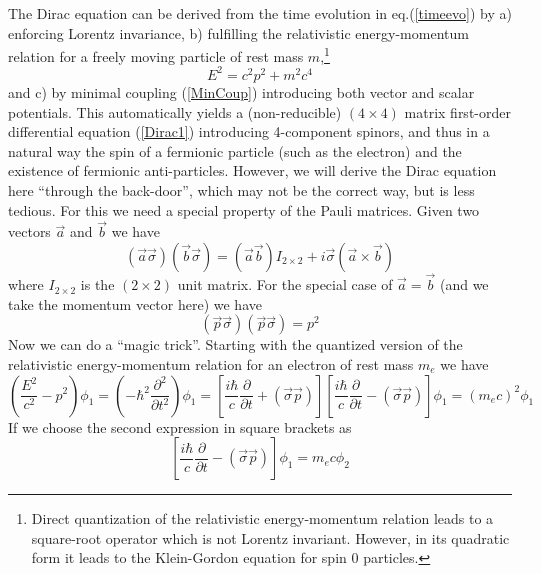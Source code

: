 \documentclass[12pt]{article}
\begin{document}
The Dirac equation can be derived from the time evolution in eq.(\ref{timeevo}) by a) enforcing Lorentz invariance, b) fulfilling the relativistic energy-momentum relation for a freely moving particle of rest mass $m$,\footnote{Direct quantization of the relativistic energy-momentum relation leads to a square-root operator which is not Lorentz invariant. However, in its quadratic form it leads to the Klein-Gordon equation for spin 0 particles.}
\begin{equation}
   E^2 = c^2p^2 + m^2c^4
   \label{RelEnergy}
\end{equation}
and c) by minimal coupling (\ref{MinCoup}) introducing both vector and scalar potentials. This automatically yields a (non-reducible) $(4\times 4)$ matrix first-order differential equation (\ref{Dirac1}) introducing 4-component spinors, and thus in a natural way the spin of a fermionic particle (such as the electron) and the existence of fermionic anti-particles. However, we will derive the Dirac equation here ``through the back-door'', which may not be the correct way, but is less tedious. For this we need a special property of the Pauli matrices. Given two vectors $\vec{a}$ and $\vec{b}$ we have
\begin{equation}
   \left(\vec{a}\vec{\sigma} \right) \left(\vec{b}\vec{\sigma} \right) = \left(\vec{a}\vec{b} \right) I_{2\times 2} + i\vec{\sigma} \left(\vec{a}\times \vec{b} \right)
   \label{PropPauli}
\end{equation}
where $I_{2\times 2}$ is the $(2\times 2)$ unit matrix. For the special case of $\vec{a}=\vec{b}$ (and we take the momentum vector here) we have
\begin{equation}
   \left(\vec{p}\vec{\sigma} \right) \left(\vec{p}\vec{\sigma} \right) = p^2
   \label{PropPauli1}
\end{equation}
Now we can do a ``magic trick''. Starting with the quantized version of the relativistic energy-momentum relation for an electron of rest mass $m_e$ we have
\begin{equation}
   \left(\frac{E^2}{c^2}-p^2\right)\phi_1 = \left( -\hbar^2 \frac{\partial^2}{\partial t^2} \right)\phi_1 = \left[ \frac{i\hbar}{c} \frac{\partial}{\partial t} + \left(\vec{\sigma}\vec{p}\right) \right] \left[ \frac{i\hbar}{c} \frac{\partial}{\partial t} - \left(\vec{\sigma}\vec{p}\right) \right]\phi_1 = \left( m_ec\right)^2\phi_1
   \label{QuantEnerMom}
\end{equation}
If we choose the second expression in square brackets as
\begin{equation}
   \left[ \frac{i\hbar}{c} \frac{\partial}{\partial t} - \left(\vec{\sigma}\vec{p}\right) \right]\phi_1 = m_ec\phi_2
   \label{QuantEnerMom1}
\end{equation}
\end{document}
